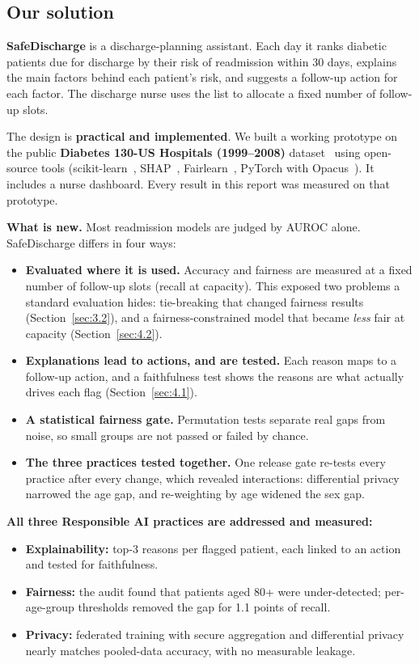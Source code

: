 \documentclass[10pt,a4paper]{article}
\newcommand{\lead}[1]{\needspace{4\baselineskip}\textbf{#1}}
\begin{document}
\subsection{Our solution}\label{sec:1.3}

\textbf{SafeDischarge} is a discharge-planning assistant. Each day it ranks diabetic patients due for discharge by their risk of readmission within 30 days, explains the main factors behind each patient's risk, and suggests a follow-up action for each factor. The discharge nurse uses the list to allocate a fixed number of follow-up slots.

The design is \textbf{practical and implemented}. We built a working prototype on the public \textbf{Diabetes 130-US Hospitals (1999–2008)} dataset~\cite{strack2014} using open-source tools (scikit-learn~\cite{pedregosa2011}, SHAP~\cite{lundberg2017}, Fairlearn~\cite{bird2020}, PyTorch with Opacus~\cite{yousefpour2021}). It includes a nurse dashboard. Every result in this report was measured on that prototype.

\textbf{What is new.} Most readmission models are judged by AUROC alone. SafeDischarge differs in four ways:
\begin{itemize}
\item \textbf{Evaluated where it is used.} Accuracy and fairness are measured at a fixed number of follow-up slots (recall at capacity). This exposed two problems a standard evaluation hides: tie-breaking that changed fairness results (Section~\ref{sec:3.2}), and a fairness-constrained model that became \emph{less} fair at capacity (Section~\ref{sec:4.2}).
\item \textbf{Explanations lead to actions, and are tested.} Each reason maps to a follow-up action, and a faithfulness test shows the reasons are what actually drives each flag (Section~\ref{sec:4.1}).
\item \textbf{A statistical fairness gate.} Permutation tests separate real gaps from noise, so small groups are not passed or failed by chance.
\item \textbf{The three practices tested together.} One release gate re-tests every practice after every change, which revealed interactions: differential privacy narrowed the age gap, and re-weighting by age widened the sex gap.
\end{itemize}

\lead{All three Responsible AI practices are addressed and measured:}
\begin{itemize}
\item \textbf{Explainability:} top-3 reasons per flagged patient, each linked to an action and tested for faithfulness.
\item \textbf{Fairness:} the audit found that patients aged 80+ were under-detected; per-age-group thresholds removed the gap for 1.1 points of recall.
\item \textbf{Privacy:} federated training with secure aggregation and differential privacy nearly matches pooled-data accuracy, with no measurable leakage.
\end{itemize}
\end{document}
